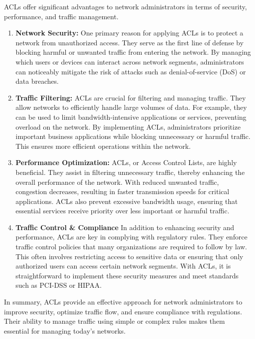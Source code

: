 \documentclass[11pt,a4paper]{article}
\begin{document}
  ACLs offer significant advantages to network administrators in terms of security, performance, and traffic management.

  \begin{enumerate}
    \item \textbf{Network Security:} One primary reason for applying ACLs is to protect a network from unauthorized access. They serve as the first line of defense by blocking harmful or unwanted traffic from entering the network. By managing which users or devices can interact across network segments, administrators can noticeably mitigate the risk of attacks such as denial-of-service (DoS) or data breaches.
    
    \item \textbf{Traffic Filtering:} ACLs are crucial for filtering and managing traffic. They allow networks to efficiently handle large volumes of data. For example, they can be used to limit bandwidth-intensive applications or services, preventing overload on the network. By implementing ACLs, administrators prioritize important business applications while blocking unnecessary or harmful traffic. This ensures more efficient operations within the network.
    
    \item \textbf{Performance Optimization:} ACLs, or Access Control Lists, are highly beneficial. They assist in filtering unnecessary traffic, thereby enhancing the overall performance of the network. With reduced unwanted traffic, congestion decreases, resulting in faster transmission speeds for critical applications. ACLs also prevent excessive bandwidth usage, ensuring that essential services receive priority over less important or harmful traffic.

    
    \item \textbf{Traffic Control \& Compliance} In addition to enhancing security and performance, ACLs are key in complying with regulatory rules. They enforce traffic control policies that many organizations are required to follow by law. This often involves restricting access to sensitive data or ensuring that only authorized users can access certain network segments. With ACLs, it is straightforward to implement these security measures and meet standards such as PCI-DSS or HIPAA.
    
  \end{enumerate}

  In summary, ACLs provide an effective approach for network administrators to improve security, optimize traffic flow, and ensure compliance with regulations. Their ability to manage traffic using simple or complex rules makes them essential for managing today’s networks.



\newpage


\begin{multicols}{2}
    \small
    
    \makeatletter
  \renewcommand\@biblabel[1]{#1.} 
    
   
\end{multicols}
  
\end{document}
